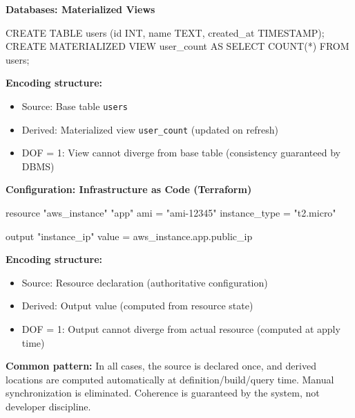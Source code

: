 \textbf{Databases: Materialized Views}

\begin{code}
CREATE TABLE users (id INT, name TEXT, created_at TIMESTAMP);
CREATE MATERIALIZED VIEW user_count AS
  SELECT COUNT(*) FROM users;
\end{code}

\textbf{Encoding structure:}
\begin{itemize}
\tightlist
\item Source: Base table \texttt{users}
\item Derived: Materialized view \texttt{user\_count} (updated on refresh)
\item DOF = 1: View cannot diverge from base table (consistency guaranteed by DBMS)
\end{itemize}

\textbf{Configuration: Infrastructure as Code (Terraform)}

\begin{code}
resource "aws_instance" "app" {
  ami = "ami-12345"
  instance_type = "t2.micro"
}

output "instance_ip" {
  value = aws_instance.app.public_ip
}
\end{code}

\textbf{Encoding structure:}
\begin{itemize}
\tightlist
\item Source: Resource declaration (authoritative configuration)
\item Derived: Output value (computed from resource state)
\item DOF = 1: Output cannot diverge from actual resource (computed at apply time)
\end{itemize}

\textbf{Common pattern:} In all cases, the source is declared once, and derived locations are computed automatically at definition/build/query time. Manual synchronization is eliminated. Coherence is guaranteed by the system, not developer discipline.

